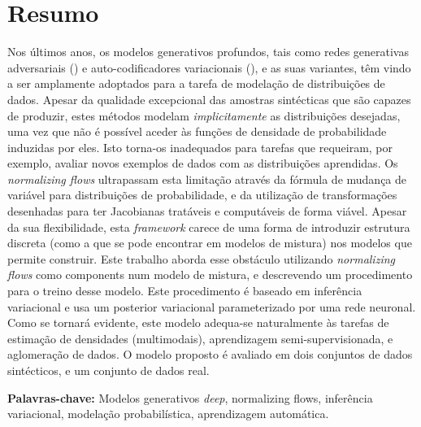 \section*{Resumo}


Nos últimos anos, os modelos generativos profundos, tais como redes generativas
adversariais (\autocite{GAN}) e auto-codificadores variacionais (\autocite{vae}),
e as suas variantes, têm vindo a ser amplamente adoptados para a tarefa de modelação
de distribuições de dados. Apesar da qualidade excepcional das amostras sintécticas
que são capazes de produzir, estes métodos modelam \emph{implicitamente} as
distribuições desejadas, uma vez que não é possível aceder às funções de densidade
de probabilidade induzidas por eles. Isto torna-os inadequados para tarefas que
requeiram, por exemplo, avaliar novos exemplos de dados com as distribuições
aprendidas. Os \emph{normalizing flows} ultrapassam esta limitação através da
fórmula de mudança de variável para distribuições de probabilidade, e da utilização
de transformações desenhadas para ter Jacobianas tratáveis e computáveis de forma
viável. Apesar da sua flexibilidade, esta \emph{framework} carece de uma forma
de introduzir estrutura discreta (como a que se pode encontrar em modelos de mistura)
nos modelos que permite construir. Este trabalho aborda esse obstáculo utilizando
\emph{normalizing flows} como components num modelo de mistura, e descrevendo
um procedimento para o treino desse modelo. Este procedimento é baseado em
inferência variacional e usa um posterior variacional parameterizado por uma
rede neuronal. Como se tornará evidente, este modelo adequa-se naturalmente às
tarefas de estimação de densidades (multimodais), aprendizagem semi-supervisionada,
e aglomeração de dados. O modelo proposto é avaliado em dois conjuntos de dados
sintécticos, e um conjunto de dados real.
\vfill

\textbf{\Large Palavras-chave:} Modelos generativos \emph{deep}, normalizing flows,
inferência variacional, modelação probabilística, aprendizagem automática.
